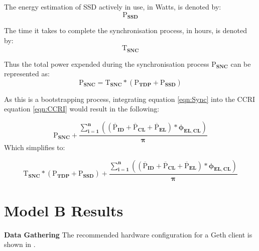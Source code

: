  The energy estimation of SSD actively in use, in Watts, is denoted by:
 \begin{equation*}
    \boldsymbol{\mathrm{P}_{SSD}} 
\end{equation*}

The time it takes to complete the synchronisation process, in hours, is denoted by:
\begin{equation*}
    \boldsymbol{\mathrm{T}_{SNC}}
\end{equation*}

Thus the total power expended during the synchronisation process $\boldsymbol{\mathrm{P}_{SNC}}$ can be represented as:
\begin{equation}
    \boldsymbol{\mathrm{P}_{SNC} = \mathrm{T}_{SNC} * \left({\mathrm{P}_{TDP}} + \mathrm{P}_{SSD}\right)} \label{eqn:Sync}
\end{equation}

As this is a bootstrapping process, integrating equation \ref{eqn:Sync} into the CCRI equation \ref{eqn:CCRI} would result in the following:

\begin{equation*}
    \boldsymbol{\mathrm{P}_{SNC} +  {\frac{\displaystyle\sum\limits_{i=1}^{n}{ \left({\left(\mathrm{\overline{P}}_{ID} + \mathrm{\overline{P}}_{CL} + \mathrm{\overline{P}}_{EL}\right)} * {\phi_{EL,CL}} \right)}}
 {\pi}} } 
\end{equation*}
Which simplifies to:

\begin{equation}
     \boldsymbol{\mathrm{T}_{SNC} * \left({\mathrm{P}_{TDP}} + \mathrm{P}_{SSD}\right) +  {\frac{\displaystyle\sum\limits_{i=1}^{n}{ \left({\left(\mathrm{\overline{P}}_{ID} + \mathrm{\overline{P}}_{CL} + \mathrm{\overline{P}}_{EL}\right)} * {\phi_{EL,CL}} \right)}}
{\pi}} } \label{eqn:CCRISync}
\end{equation}



\section{Model B Results}

\textbf{Data Gathering}
The recommended hardware configuration for a Geth client is shown in .

